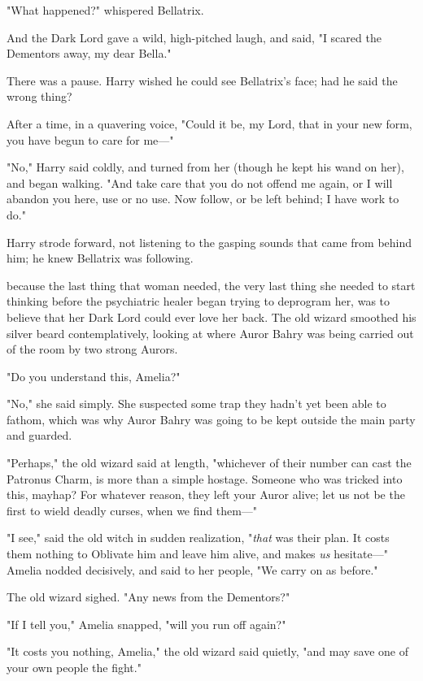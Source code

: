 "What happened?" whispered Bellatrix.

And the Dark Lord gave a wild, high-pitched laugh, and said, "I scared the
Dementors away, my dear Bella."

There was a pause. Harry wished he could see Bellatrix's face; had he said the
wrong thing?

After a time, in a quavering voice, "Could it be, my Lord, that in your new
form, you have begun to care for me\mbox{---}"

"No," Harry said coldly, and turned from her (though he kept his wand on her),
and began walking. "And take care that you do not offend me again, or I will
abandon you here, use or no use. Now follow, or be left behind; I have work to
do."

Harry strode forward, not listening to the gasping sounds that came from behind
him; he knew Bellatrix was following.

{\el} because the last thing that woman needed, the very last thing she
needed to start thinking before the psychiatric healer began trying to
deprogram her, was to believe that her Dark Lord could ever love her back.
\sbreak
The old wizard smoothed his silver beard contemplatively, looking at where
Auror Bahry was being carried out of the room by two strong Aurors.

"Do you understand this, Amelia?"

"No," she said simply. She suspected some trap they hadn't yet been able to
fathom, which was why Auror Bahry was going to be kept outside the main party
and guarded.

"Perhaps," the old wizard said at length, "whichever of their number can cast
the Patronus Charm, is more than a simple hostage. Someone who was tricked into
this, mayhap? For whatever reason, they left your Auror alive; let us not be
the first to wield deadly curses, when we find them\mbox{---}"

"I see," said the old witch in sudden realization, "\emph{that} was their plan.
It costs them nothing to Oblivate him and leave him alive, and makes \emph{us}
hesitate\mbox{---}" Amelia nodded decisively, and said to her people, "We carry on as
before."

The old wizard sighed. "Any news from the Dementors?"

"If I tell you," Amelia snapped, "will you run off again?"

"It costs you nothing, Amelia," the old wizard said quietly, "and may save one
of your own people the fight."

